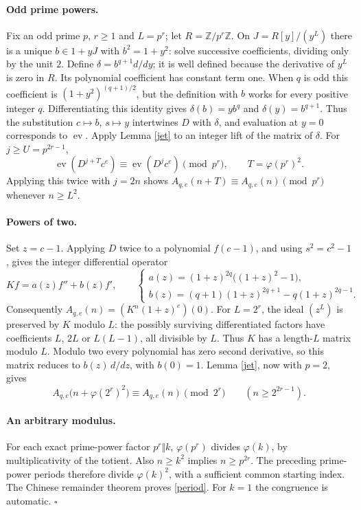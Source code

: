 \documentclass[11pt]{article}
\newcommand{\ZZ}{\mathbb Z}
\newcommand{\ev}{\operatorname{ev}}
\begin{document}
\paragraph{Odd prime powers.}
Fix an odd prime $p$, $r\geq1$ and $L=p^r$; let $R=\ZZ/p^r\ZZ$.
On $J=R[y]/(y^L)$ there is a unique $b\in1+yJ$ with
$b^2=1+y^2$: solve successive
coefficients, dividing only by the unit $2$.
Define $\delta=b^{q+1}d/dy$; it is well defined because the
derivative of $y^L$ is zero in $R$. Its polynomial coefficient has
constant term one. When $q$ is odd this coefficient is
$(1+y^2)^{(q+1)/2}$, but the definition with $b$ works for every
positive integer $q$.
Differentiating this identity gives
$\delta(b)=yb^q$ and $\delta(y)=b^{q+1}$.
Thus the substitution $c\mapsto b$, $s\mapsto y$ intertwines $D$
with $\delta$, and evaluation at $y=0$ corresponds to $\ev$.
Apply Lemma \ref{jet} to an integer lift of the matrix of $\delta$.
For $j\geq U=p^{2r-1}$,
\[
 \ev(D^{j+T}c^e)\equiv\ev(D^jc^e)\pmod{p^r},
 \qquad T=\varphi(p^r)^2.
\]
Applying this twice with $j=2n$ shows
$A_{q,e}(n+T)\equiv A_{q,e}(n)\pmod{p^r}$ whenever $n\geq L^2$.

\paragraph{Powers of two.}
Set $z=c-1$. Applying $D$ twice to a polynomial $f(c-1)$, and using
$s^2=c^2-1$, gives the integer differential operator
\begin{equation}\label{second}
 Kf=a(z)f''+b(z)f',\qquad
 \begin{cases}
 a(z)=(1+z)^{2q}\bigl((1+z)^2-1\bigr),\\
 b(z)=(q+1)(1+z)^{2q+1}-q(1+z)^{2q-1}.
 \end{cases}
\end{equation}
Consequently $A_{q,e}(n)=(K^n(1+z)^e)(0)$.
For $L=2^r$, the ideal $(z^L)$ is preserved by $K$ modulo $L$:
the possibly surviving differentiated factors have coefficients
$L$, $2L$ or $L(L-1)$, all divisible by $L$.
Thus $K$ has a length-$L$ matrix modulo $L$.
Modulo two every polynomial has zero second derivative, so this matrix
reduces to $b(z)\,d/dz$, with $b(0)=1$.
Lemma \ref{jet}, now with $p=2$, gives
\[
 A_{q,e}\bigl(n+\varphi(2^r)^2\bigr)
 \equiv A_{q,e}(n)\pmod{2^r}\qquad(n\geq2^{2r-1}).
\]

\paragraph{An arbitrary modulus.}
For each exact prime-power factor $p^r\Vert k$, $\varphi(p^r)$ divides
$\varphi(k)$, by multiplicativity of the totient. Also
$n\geq k^2$ implies $n\geq p^{2r}$.
The preceding prime-power periods therefore divide $\varphi(k)^2$,
with a sufficient common starting index. The Chinese remainder theorem
proves \eqref{period}. For $k=1$ the congruence is automatic.
\hfill$\square$
\end{document}
